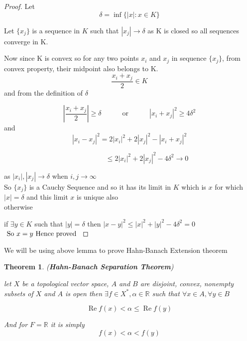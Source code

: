 \documentclass[oneside]{book}
\newtheorem{theorem}{Theorem}[section]
\begin{document}
	\begin{proof}
		
		Let
		\[
		\delta=\inf \{|x|: x \in K\}
		\]
		
		Let $\{x_{j}\}$ is a sequence in $K$ such that	$ |x_{j}| \rightarrow \delta $ as K is closed so all sequences converge in K.
		
	Now	since K is convex  so for any two points $x_{i}$ and $x_{j}$ in sequence  $\{x_{j}\}$, from convex property, their midpoint also belongs to K.
		\[
		\frac{x_{i}+x_{j}}{2} \in K
		\]
		and from the definition
		of $\delta$
		
		\[
		\left|\frac{x_{i}+x_{j}}{2}\right| \geq \delta
		\quad \quad \quad \text{or} \quad \quad \quad 
		\left|x_{i}+x_{j}\right|^{2} \geq 4{\delta}^{2}
		\]
		and
		\[
		\left|x_{i} - x_{j} \right|^{2} = 
		2\left|x_{i}\right|^{2}+2\left|x_{j}\right|^{2} - \left|x_{i}+x_{j}\right|^{2}
		\]
		
		\[ 
		\quad \quad\quad\quad\quad \leq 
		2\left|x_{i}\right|^{2}+2|x_{j}|^{2}-4 \delta^{2} \rightarrow 0
		\]
		
		as $\left|x_{i}\right|,\left|x_{j}\right| \rightarrow  \delta$ when $i, j \rightarrow \infty$ \\
		So $\{x_{j}\}$ is a Cauchy Sequence and so it has its limit in $K$ which is $x$ for which
		$ |x| = \delta  $ and this limit $x$   is unique also \\
		otherwise 
		
		if $\exists y \in K $ such that 
		$\left|y\right| = \delta $
		then
		$\left|x-y\right|^{2} \leq \left|x\right|^{2}+\left|y\right|^{2} -4 {\delta}^{2} = 0$ \\
		$\text{ So } x = y \\
		\text{ Hence proved }$
		
		
	\end{proof}

	We will be using above lemma to prove Hahn-Banach Extension theorem
	
	\hfill \break
	\begin{theorem}(\textbf{Hahn-Banach Separation Theorem})
		\label{t:0.1}
		
		\hfill \break
		let $X$ be a topological vector space, $A$ and $B$ are disjoint, convex, nonempty subsets 
		of $X$ and $A$ is open then $ \exists  f  \in X^{*}, \alpha \in \mathbb{R}$ such that
		$\forall  x \in A, \forall  y \in B$
		
		$$ \operatorname{Re}f(x) <\alpha \leq \operatorname{Re} f(y)$$
		
	And	for $F =\mathbb{R}$ it is  simply
		$$f(x)<\alpha < f(y)$$
	\end{theorem}
	
\end{document}
